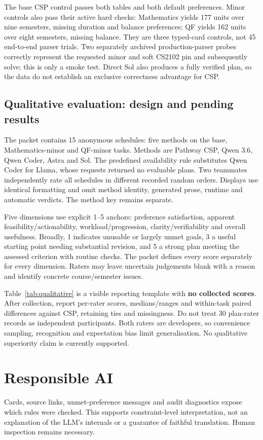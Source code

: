 The base CSP control passes both tables and both default preferences. Minor controls also pass their active hard checks: Mathematics yields 177 units over nine semesters, missing duration and balance preferences; QF yields 162 units over eight semesters, missing balance. They are three typed-card controls, not 45 end-to-end parser trials. Two separately archived production-parser probes correctly represent the requested minor and soft CS2102 pin and subsequently solve; this is only a smoke test. Direct Sol also produces a fully verified plan, so the data do not establish an exclusive correctness advantage for CSP.

\subsection{Qualitative evaluation: design and pending results}
The packet contains 15 anonymous schedules: five methods on the base, Mathematics-minor and QF-minor tasks. Methods are Pathway CSP, Qwen 3.6, Qwen Coder, Astra and Sol. The predefined availability rule substitutes Qwen Coder for Llama, whose requests returned no evaluable plans. Two teammates independently rate all schedules in different recorded random orders. Displays use identical formatting and omit method identity, generated prose, runtime and automatic verdicts. The method key remains separate.

Five dimensions use explicit 1--5 anchors: preference satisfaction, apparent feasibility/actionability, workload/progression, clarity/verifiability and overall usefulness. Broadly, 1 indicates unusable or largely unmet goals, 3 a useful starting point needing substantial revision, and 5 a strong plan meeting the assessed criterion with routine checks. The packet defines every score separately for every dimension. Raters may leave uncertain judgements blank with a reason and identify concrete course/semester issues.



Table~\ref{tab:qualitative} is a visible reporting template with \textbf{no collected scores}. After collection, report per-rater scores, medians/ranges and within-task paired differences against CSP, retaining ties and missingness. Do not treat 30 plan-rater records as independent participants. Both raters are developers, so convenience sampling, recognition and expectation bias limit generalisation. No qualitative superiority claim is currently supported.

\section{Responsible AI}
Cards, source links, unmet-preference messages and audit diagnostics expose which rules were checked. This supports constraint-level interpretation, not an explanation of the LLM's internals or a guarantee of faithful translation. Human inspection remains necessary.

